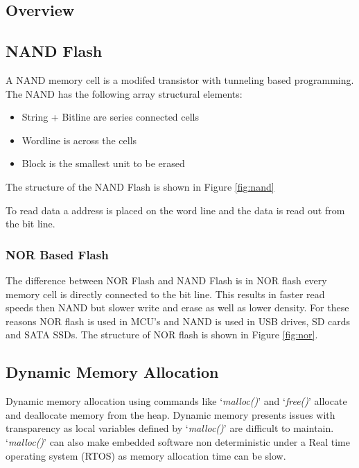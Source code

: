 \subsection{Overview}



\subsection{NAND Flash}
A NAND memory cell is a modifed transistor with tunneling based programming. The NAND has the
following array structural elements:

\begin{itemize}
    \item String + Bitline are series connected cells
    \item Wordline is across the cells
    \item Block is the smallest unit to be erased
\end{itemize}

The structure of the NAND Flash is shown in Figure \ref{fig:nand}


To read data a address is placed on the word line and the data is read out from the bit line.

\subsubsection{NOR Based Flash}
The difference between NOR Flash and NAND Flash is in NOR flash every memory cell is directly
connected to the bit line. This results in faster read speeds then NAND but slower write and erase
as well as lower density. For these reasons NOR flash is used in MCU's and NAND is used in USB
drives, SD cards and SATA SSDs. The structure of NOR flash is shown in Figure \ref{fig:nor}.



\subsection{Dynamic Memory Allocation}
Dynamic memory allocation using commands like `\textit{malloc()}' and `\textit{free()}' allocate and
deallocate memory from the heap. Dynamic memory presents issues with transparency as local
variables defined by `\textit{malloc()}' are difficult to maintain. `\textit{malloc()}' can also
make embedded software non deterministic under a Real time operating system (RTOS) as memory
allocation time can be slow.

